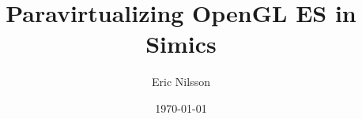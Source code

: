 \title{Paravirtualizing OpenGL ES in Simics}
\author{Eric Nilsson}
\date{\today}

\begin{frame}
	\titlepage
\end{frame}
